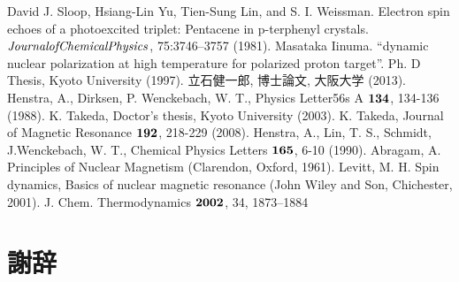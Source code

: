 \documentclass[12pt,a4j]{ujreport}
\begin{document}
 \makeatletter
 \renewcommand{\theequation}{\thechapter.\arabic{equation}}
 \makeatother

 \makeatletter
 \renewcommand{\thefigure}{\thechapter.\arabic{figure}}
 \makeatother
 
 \renewcommand{\bibname}{参考文献}

 \newpage

 \setcounter{page}{1}


 
 
 
 
 
 
 


\begin{thebibliography}{99}
\addcontentsline{toc}{chapter}{\bibname}




David J. Sloop, Hsiang-Lin Yu, Tien-Sung Lin, and S. I. Weissman. Electron spin
echoes of a photoexcited triplet: Pentacene in p-terphenyl crystals. $\it Journal of Chemical Physics $, 75:3746–3757 (1981).
Masataka Iinuma. “dynamic nuclear polarization at high temperature for polarized
proton target”. Ph. D Thesis, Kyoto University (1997).
立石健一郎, 博士論文, 大阪大学 (2013).
Henstra, A., Dirksen, P. Wenckebach, W. T., Physics Letter56s A $\bf 134$, 134-136 (1988).
K. Takeda, Doctor’s thesis, Kyoto University (2003).
K. Takeda, Journal of Magnetic Resonance $\bf 192$, 218-229 (2008).
Henstra, A., Lin, T. S., Schmidt, J.Wenckebach, W. T., Chemical Physics Letters $\bf 165$, 6-10 (1990).
Abragam, A. Principles of Nuclear Magnetism (Clarendon, Oxford, 1961).
Levitt, M. H. Spin dynamics, Basics of nuclear magnetic resonance (John Wiley
and Son, Chichester, 2001).
J. Chem. Thermodynamics $\bf{2002}$, 34, 1873–1884
\end{thebibliography}


 \chapter*{謝辞}


\end{document}
